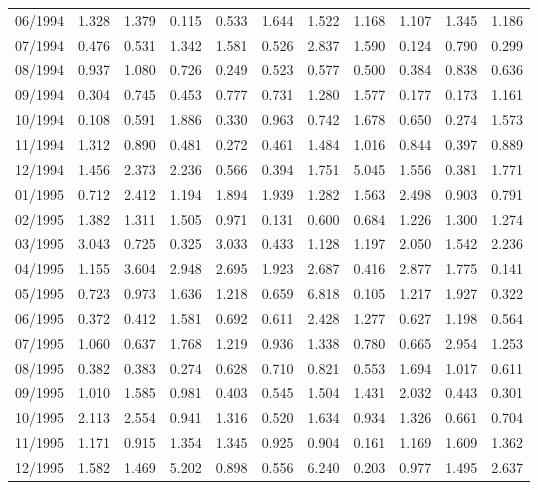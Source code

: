 \begin{tabular}{lrrrrrrrrrr}
06/1994 &  1.328 &  1.379 &  0.115 &  0.533 &  1.644 &  1.522 &  1.168 &  1.107 &  1.345 &  1.186 \\
07/1994 &  0.476 &  0.531 &  1.342 &  1.581 &  0.526 &  2.837 &  1.590 &  0.124 &  0.790 &  0.299 \\
08/1994 &  0.937 &  1.080 &  0.726 &  0.249 &  0.523 &  0.577 &  0.500 &  0.384 &  0.838 &  0.636 \\
09/1994 &  0.304 &  0.745 &  0.453 &  0.777 &  0.731 &  1.280 &  1.577 &  0.177 &  0.173 &  1.161 \\
10/1994 &  0.108 &  0.591 &  1.886 &  0.330 &  0.963 &  0.742 &  1.678 &  0.650 &  0.274 &  1.573 \\
11/1994 &  1.312 &  0.890 &  0.481 &  0.272 &  0.461 &  1.484 &  1.016 &  0.844 &  0.397 &  0.889 \\
12/1994 &  1.456 &  2.373 &  2.236 &  0.566 &  0.394 &  1.751 &  5.045 &  1.556 &  0.381 &  1.771 \\
01/1995 &  0.712 &  2.412 &  1.194 &  1.894 &  1.939 &  1.282 &  1.563 &  2.498 &  0.903 &  0.791 \\
02/1995 &  1.382 &  1.311 &  1.505 &  0.971 &  0.131 &  0.600 &  0.684 &  1.226 &  1.300 &  1.274 \\
03/1995 &  3.043 &  0.725 &  0.325 &  3.033 &  0.433 &  1.128 &  1.197 &  2.050 &  1.542 &  2.236 \\
04/1995 &  1.155 &  3.604 &  2.948 &  2.695 &  1.923 &  2.687 &  0.416 &  2.877 &  1.775 &  0.141 \\
05/1995 &  0.723 &  0.973 &  1.636 &  1.218 &  0.659 &  6.818 &  0.105 &  1.217 &  1.927 &  0.322 \\
06/1995 &  0.372 &  0.412 &  1.581 &  0.692 &  0.611 &  2.428 &  1.277 &  0.627 &  1.198 &  0.564 \\
07/1995 &  1.060 &  0.637 &  1.768 &  1.219 &  0.936 &  1.338 &  0.780 &  0.665 &  2.954 &  1.253 \\
08/1995 &  0.382 &  0.383 &  0.274 &  0.628 &  0.710 &  0.821 &  0.553 &  1.694 &  1.017 &  0.611 \\
09/1995 &  1.010 &  1.585 &  0.981 &  0.403 &  0.545 &  1.504 &  1.431 &  2.032 &  0.443 &  0.301 \\
10/1995 &  2.113 &  2.554 &  0.941 &  1.316 &  0.520 &  1.634 &  0.934 &  1.326 &  0.661 &  0.704 \\
11/1995 &  1.171 &  0.915 &  1.354 &  1.345 &  0.925 &  0.904 &  0.161 &  1.169 &  1.609 &  1.362 \\
12/1995 &  1.582 &  1.469 &  5.202 &  0.898 &  0.556 &  6.240 &  0.203 &  0.977 &  1.495 &  2.637 \\

\end{tabular}
